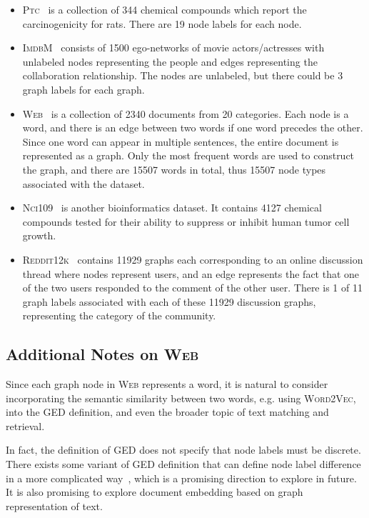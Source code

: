 \documentclass{article}
\newcommand{\wv}{\textsc{Word2Vec}\xspace}
\newcommand{\ptc}{\textsc{Ptc}\xspace}
\newcommand{\imdb}{\textsc{ImdbM}\xspace}
\newcommand{\web}{\textsc{Web}\xspace}
\newcommand{\nci}{\textsc{Nci109}\xspace}
\newcommand{\reddit}{\textsc{Reddit12k}\xspace}
\begin{document}
\begin{itemize}
     \item \ptc~\cite{shrivastava2014new} is a collection of 344 chemical compounds which report the carcinogenicity for rats. There are 19 node labels for each node.
    
    \item \imdb~\cite{yanardag2015deep} consists of 1500 ego-networks of movie actors/actresses with unlabeled nodes representing the people and edges representing the collaboration relationship. The nodes are unlabeled, but there could be 3 graph labels for each graph. 
    
    \item \web~\cite{riesen2008iam} is a collection of 2340 documents from 20 categories. Each node is a word, and there is an edge between two words if one word precedes the other. Since one word can appear in multiple sentences, the entire document is represented as a graph. Only the most frequent words are used to construct the graph, and there are 15507 words in total, thus 15507 node types associated with the dataset.
    
    \item \nci~\cite{wale2008comparison} is another bioinformatics dataset. It contains 4127 chemical compounds tested for their ability to suppress or inhibit human tumor cell growth.
    
    \item \reddit~\cite{yanardag2015deep} contains 11929 graphs each corresponding to an online discussion thread where nodes represent users, and an edge represents the fact that one of the two users responded to the comment of the other user. There is 1 of 11 graph labels associated with each of these 11929 discussion graphs, representing the category of the community.
\end{itemize}


\subsection{Additional Notes on \web}
\label{subsec-notes-web}

Since each graph node in \web represents a word, it is natural to consider incorporating the semantic similarity between two words, e.g. using \wv, into the GED definition, and even the broader topic of text matching and retrieval. 

In fact, the definition of GED does not specify that node labels must be discrete. There exists some variant of GED definition that can define node label difference in a more complicated way~\cite{riesen2013novel}, which is a promising direction to explore in future. It is also promising to explore document embedding based on graph representation of text.
\end{document}
